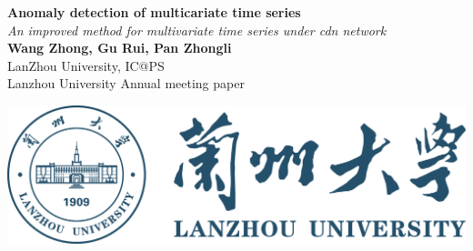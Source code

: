 \documentclass[a0,portrait]{a0poster}
\begin{document}


\begin{minipage}[b]{0.75\linewidth}
\Huge \color{NavyBlue} \textbf{Anomaly detection of multicariate time series} \color{Black}\\ %
\LARGE \textit{An improved method for multivariate time series under cdn network}\\[2cm] %
\LARGE \textbf{Wang Zhong, Gu Rui, Pan Zhongli}\\[0.5cm] %
\LARGE LanZhou University, IC@PS\\ [0.4cm] %
\large Lanzhou University Annual meeting paper 
\\
\end{minipage}
%
\hspace{-5.5cm}\begin{minipage}[b]{0.3\linewidth}
\includegraphics[scale=2.5]{lzu.png}
\end{minipage}

\vspace{1cm} %

\end{document}
